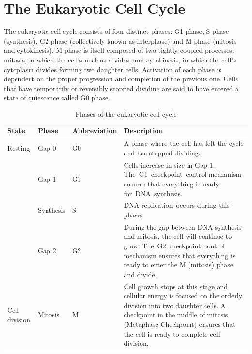 \hypertarget{the-eukaryotic-cell-cycle}{%
\section{The Eukaryotic Cell Cycle}\label{the-eukaryotic-cell-cycle}}

The eukaryotic cell cycle consists of four distinct phases: G1 phase, S phase (synthesis), G2 phase (collectively known as interphase) and M phase (mitosis and cytokinesis). M phase is itself composed of two tightly coupled processes: mitosis, in which the cell's nucleus divides, and cytokinesis, in which the cell's cytoplasm divides forming two daughter cells. Activation of each phase is dependent on the proper progression and completion of the previous one. Cells that have temporarily or reversibly stopped dividing are said to have entered a state of quiescence called G0 phase.

\onecolumn
\begin{table}
\caption{\label{tab:cellcycle}Phases of the eukaryotic cell cycle}
\centering
\begin{tabular}[t]{>{\raggedright\arraybackslash}p{10em}>{\raggedright\arraybackslash}p{5em}>{\raggedright\arraybackslash}p{5em}>{\raggedright\arraybackslash}p{20em}}
\toprule
State & Phase & Abbreviation & Description\\
\midrule
Resting & Gap 0 & G0 & A phase where the cell has left the cycle and has stopped dividing.\\
\cmidrule{1-4}
 & Gap 1 & G1 & Cells increase in size in Gap 1. The G1 checkpoint control mechanism ensures that everything is ready for DNA synthesis.\\
\cmidrule{2-4}
 & Synthesis & S & DNA replication occurs during this phase.\\
\cmidrule{2-4}
\multirow{-3}{*}{\raggedright\arraybackslash Interphase} & Gap 2 & G2 & During the gap between DNA synthesis and mitosis, the cell will continue to grow. The G2 checkpoint control mechanism ensures that everything is ready to enter the M (mitosis) phase and divide.\\
\cmidrule{1-4}
Cell division & Mitosis & M & Cell growth stops at this stage and cellular energy is focused on the orderly division into two daughter cells. A checkpoint in the middle of mitosis (Metaphase Checkpoint) ensures that the cell is ready to complete cell division.\\
\bottomrule
\end{tabular}
\end{table}
\twocolumn

